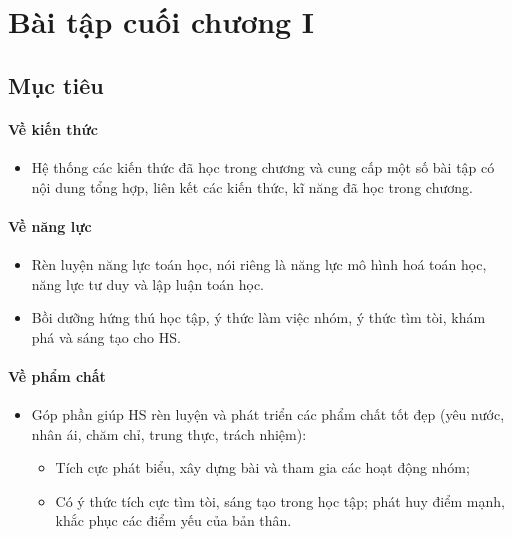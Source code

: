 \section{Bài tập cuối chương I}

\subsection{Mục tiêu}

\paragraph{Về kiến thức}

\begin{itemize}
	\item Hệ thống các kiến thức đã học trong chương và cung cấp một số bài tập có nội dung tổng hợp, liên kết các kiến thức, kĩ năng đã học trong chương.
\end{itemize}

\paragraph{Về năng lực}

\begin{itemize}
	\item Rèn luyện năng lực toán học, nói riêng là năng lực mô hình hoá toán học, năng lực tư duy và lập luận toán học.
	\item Bồi dưỡng hứng thú học tập, ý thức làm việc nhóm, ý thức tìm tòi, khám phá và sáng tạo cho HS. 
\end{itemize}

\paragraph{Về phẩm chất}

\begin{itemize}
	\item Góp phần giúp HS rèn luyện và phát triển các phẩm chất tốt đẹp (yêu nước, nhân ái, chăm chỉ, trung thực, trách nhiệm): 
	\begin{itemize}
		\item Tích cực phát biểu, xây dựng bài và tham gia các hoạt động nhóm; 
		\item Có ý thức tích cực tìm tòi, sáng tạo trong học tập; phát huy điểm mạnh, khắc phục các điểm yếu của bản thân. 
	\end{itemize}
\end{itemize}

